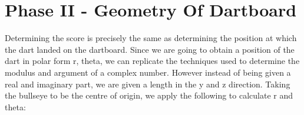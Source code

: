 \documentclass[a4paper]{article}
\begin{document}
\section{Phase II - Geometry Of Dartboard}
Determining the score is precisely the same as determining the position at which the dart landed
on the dartboard. Since we are going to obtain a position of the dart in polar form r, theta, we can
replicate the techniques used to determine the modulus and argument of a complex number.
However instead of being given a real and imaginary part, we are given a length in the y and z direction.
Taking the bullseye to be the centre of origin, we apply the following to calculate r and theta:
    
\end{document}
